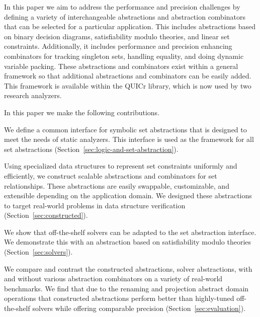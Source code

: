 In this paper we aim to address the performance and precision challenges
by defining a variety of interchangeable abstractions and abstraction
combinators that can be selected for a particular application.
This includes abstractions based on binary decision diagrams,
satisfiability modulo theories, and linear set constraints.
Additionally, it includes performance and precision enhancing combinators for tracking
singleton sets, handling equality, and doing dynamic variable packing.
These abstractions and combinators exist within a general framework so
that additional abstractions and combinators can be easily added.
This framework is available within the QUICr library, which is now
used by two research analyzers.

In this paper we make the following contributions.
\begin{compactitem}
\item We define a common interface for symbolic set abstractions that is designed to meet the needs of static analyzers.
  This interface is used as the framework for all set
  abstractions (Section~\ref{sec:logic-and-set-abstraction}).
\item Using specialized data structures to represent set constraints uniformly and efficiently, we construct scalable abstractions and combinators for set relationships.  These abstractions are easily swappable, customizable, and extensible depending on the application domain.  We designed these abstractions to target real-world problems in data structure verification (Section~\ref{sec:constructed}).
\item We show that off-the-shelf solvers can be adapted to the set abstraction interface.  We demonstrate this with an abstraction based on satisfiability modulo theories (Section~\ref{sec:solvers}).
\item We compare and contrast the constructed abstractions, solver
  abstractions, with and without various abstraction combinators on a
  variety of real-world benchmarks.  We find that due to the renaming and projection abstract domain operations that constructed abstractions perform better than highly-tuned off-the-shelf solvers while offering comparable precision (Section~\ref{sec:evaluation}).
\end{compactitem}